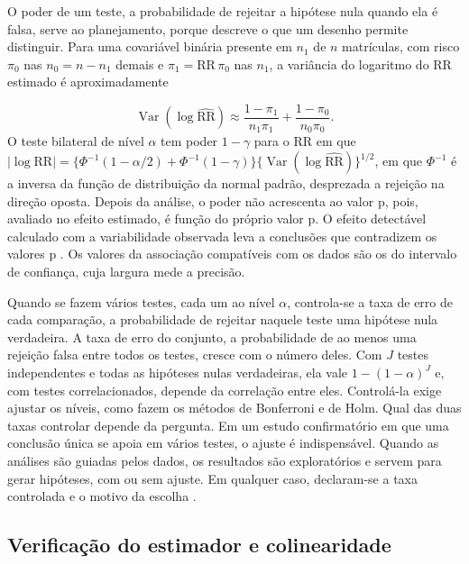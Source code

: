 \documentclass[12pt,a4paper]{article}
\begin{document}
O poder de um teste, a probabilidade de rejeitar a hipótese nula quando ela é falsa, serve ao planejamento, porque descreve o que um desenho permite distinguir. Para uma covariável binária presente em $n_1$ de $n$ matrículas, com risco $\pi_0$ nas $n_0 = n - n_1$ demais e $\pi_1 = \text{RR}\,\pi_0$ nas $n_1$, a variância do logaritmo do RR estimado é aproximadamente

\begin{equation}
  \operatorname{Var}(\log \widehat{\text{RR}}) \approx \frac{1-\pi_1}{n_1\pi_1} + \frac{1-\pi_0}{n_0\pi_0}. \label{eq:poder}
\end{equation}
O teste bilateral de nível $\alpha$ tem poder $1-\gamma$ para o RR em que $|\log \text{RR}| = \{\Phi^{-1}(1-\alpha/2) + \Phi^{-1}(1-\gamma)\}\{\operatorname{Var}(\log \widehat{\text{RR}})\}^{1/2}$, em que $\Phi^{-1}$ é a inversa da função de distribuição da normal padrão, desprezada a rejeição na direção oposta. Depois da análise, o poder não acrescenta ao valor p, pois, avaliado no efeito estimado, é função do próprio valor p. O efeito detectável calculado com a variabilidade observada leva a conclusões que contradizem os valores p \citep{hoenig2001abuse}. Os valores da associação compatíveis com os dados são os do intervalo de confiança, cuja largura mede a precisão.

Quando se fazem vários testes, cada um ao nível $\alpha$, controla-se a taxa de erro de cada comparação, a probabilidade de rejeitar naquele teste uma hipótese nula verdadeira. A taxa de erro do conjunto, a probabilidade de ao menos uma rejeição falsa entre todos os testes, cresce com o número deles. Com $J$ testes independentes e todas as hipóteses nulas verdadeiras, ela vale $1-(1-\alpha)^J$ e, com testes correlacionados, depende da correlação entre eles. Controlá-la exige ajustar os níveis, como fazem os métodos de Bonferroni e de Holm. Qual das duas taxas controlar depende da pergunta. Em um estudo confirmatório em que uma conclusão única se apoia em vários testes, o ajuste é indispensável. Quando as análises são guiadas pelos dados, os resultados são exploratórios e servem para gerar hipóteses, com ou sem ajuste. Em qualquer caso, declaram-se a taxa controlada e o motivo da escolha \citep{bender2001adjusting}.

\subsection{Verificação do estimador e colinearidade}
\label{sec:fund-verificacao}
\end{document}
